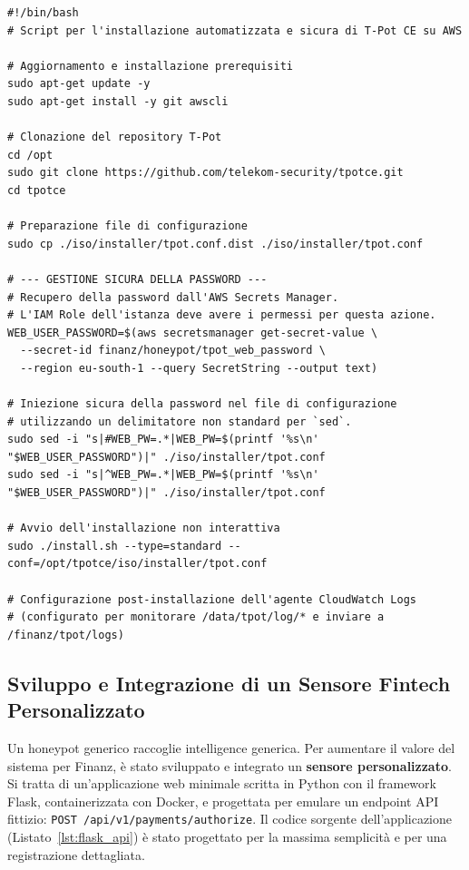 \begin{lstlisting}[caption={Script \texttt{tpot-install-script.sh} per l'installazione sicura}, label=lst:tpot_secure_install]
#!/bin/bash
# Script per l'installazione automatizzata e sicura di T-Pot CE su AWS

# Aggiornamento e installazione prerequisiti
sudo apt-get update -y
sudo apt-get install -y git awscli

# Clonazione del repository T-Pot
cd /opt
sudo git clone https://github.com/telekom-security/tpotce.git
cd tpotce

# Preparazione file di configurazione
sudo cp ./iso/installer/tpot.conf.dist ./iso/installer/tpot.conf

# --- GESTIONE SICURA DELLA PASSWORD ---
# Recupero della password dall'AWS Secrets Manager.
# L'IAM Role dell'istanza deve avere i permessi per questa azione.
WEB_USER_PASSWORD=$(aws secretsmanager get-secret-value \
  --secret-id finanz/honeypot/tpot_web_password \
  --region eu-south-1 --query SecretString --output text)

# Iniezione sicura della password nel file di configurazione
# utilizzando un delimitatore non standard per `sed`.
sudo sed -i "s|#WEB_PW=.*|WEB_PW=$(printf '%s\n' "$WEB_USER_PASSWORD")|" ./iso/installer/tpot.conf
sudo sed -i "s|^WEB_PW=.*|WEB_PW=$(printf '%s\n' "$WEB_USER_PASSWORD")|" ./iso/installer/tpot.conf

# Avvio dell'installazione non interattiva
sudo ./install.sh --type=standard --conf=/opt/tpotce/iso/installer/tpot.conf

# Configurazione post-installazione dell'agente CloudWatch Logs
# (configurato per monitorare /data/tpot/log/* e inviare a /finanz/tpot/logs)
\end{lstlisting}

\subsection{Sviluppo e Integrazione di un Sensore Fintech Personalizzato}
Un honeypot generico raccoglie intelligence generica. Per aumentare il valore del sistema per Finanz, è stato sviluppato e integrato un \textbf{sensore personalizzato}. Si tratta di un'applicazione web minimale scritta in Python con il framework Flask, containerizzata con Docker, e progettata per emulare un endpoint API fittizio: \texttt{POST /api/v1/payments/authorize}. Il codice sorgente dell'applicazione (Listato~\ref{lst:flask_api}) è stato progettato per la massima semplicità e per una registrazione dettagliata.

